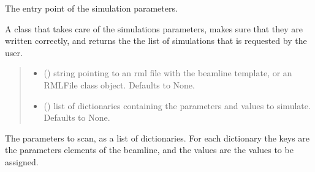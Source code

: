 \documentclass[letterpaper,10pt,english]{sphinxmanual}
\begin{document}
\begin{fulllineitems}
\label{\detokenize{code_documentation:raypyng.simulate.SimulationParams}}
\pysigstartsignatures
{}
\pysigstopsignatures
\sphinxAtStartPar
The entry point of the simulation parameters.

\sphinxAtStartPar
A class that takes care of the simulations parameters,
makes sure that they are written correctly,
and returns the the list of simulations that is requested by the user.
\begin{quote}\begin{description}
\begin{itemize}
\item {} 
\sphinxAtStartPar
{} (\sphinxstyleliteralemphasis{\sphinxupquote{, }}) \textendash{} string pointing to an rml
file with the beamline template,
or an RMLFile class object.
Defaults to None.

\item {} 
\sphinxAtStartPar
{} (\sphinxstyleliteralemphasis{\sphinxupquote{, }}) \textendash{} list of dictionaries containing the
parameters and values to simulate.
Defaults to None.

\end{itemize}

\end{description}\end{quote}

\begin{fulllineitems}
\label{\detokenize{code_documentation:raypyng.simulate.SimulationParams.params}}
\pysigstartsignatures
{}
\pysigstopsignatures
\sphinxAtStartPar
The parameters to scan, as a list of dictionaries.
For each dictionary the keys are the parameters elements of the beamline, and the values are the
values to be assigned.


\end{fulllineitems}
\end{fulllineitems}
\end{document}
